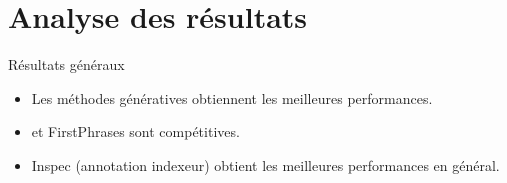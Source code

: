 \section*{Analyse des résultats}

\begin{frame}{}
    \sectionpage
\end{frame}

\begin{frame}{Résultats généraux}
    
    \begin{itemize}
        \item Les méthodes génératives obtiennent les meilleures performances.
        \item \tfidf{} et FirstPhrases sont compétitives. %
        \item Inspec (annotation indexeur) obtient les meilleures performances en général.
    \end{itemize}
\end{frame}

